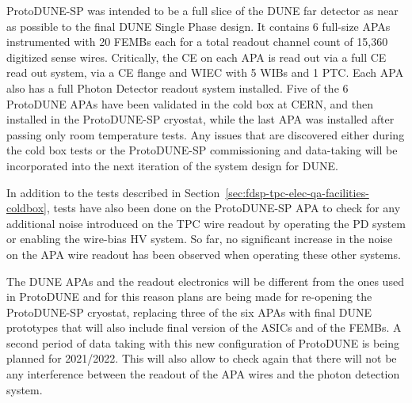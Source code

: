 ProtoDUNE-SP was intended to be a full slice of the DUNE far detector as near as possible to the final DUNE Single Phase design. It contains 6 full-size APAs instrumented with 20 FEMBs each for a total readout channel count of 15,360 digitized sense wires. Critically, the CE on each APA is read out via a full CE read out system, via a CE flange and WIEC with 5 WIBs and 1 PTC. Each APA also has a full Photon Detector readout system installed. Five of the 6 ProtoDUNE APAs have been validated in the cold box at CERN, and then installed in the ProtoDUNE-SP cryostat, while the last APA was installed after passing only room temperature tests. Any issues that are discovered either during the cold box tests or the ProtoDUNE-SP commissioning and data-taking will be incorporated into the next iteration of the system design for DUNE.

In addition to the tests described in Section~\ref{sec:fdsp-tpc-elec-qa-facilities-coldbox}, tests have also been done on the ProtoDUNE-SP APA to check for any additional noise introduced on the TPC wire readout by operating the PD system or enabling the wire-bias HV system. So far, no significant increase in the noise on the APA wire readout has been observed when operating these other systems.

The DUNE APAs and the readout electronics will be different from the ones used in ProtoDUNE and for this reason plans are being made for re-opening the ProtoDUNE-SP cryostat, replacing three of the six APAs with final DUNE prototypes that will also include final version of the ASICs and of the FEMBs. A second period of data taking with this new configuration of ProtoDUNE is being planned for 2021/2022. This will also allow to check again that there will not be any interference between the readout of the APA wires and the photon detection system.
